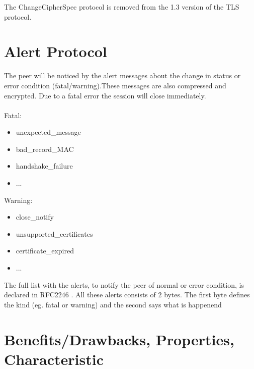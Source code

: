 The ChangeCipherSpec protocol is removed from the 1.3 version of the TLS protocol.

\section{Alert Protocol}
\label{sec:alert_protocol}
The peer will be noticed by the alert messages about the change in status or error condition (fatal/warning).These messages are also compressed and encrypted. Due to a fatal error the session will close immediately.\\\\ 
Fatal:
\begin{itemize}
	\item unexpected\_message
	 \item bad\_record\_MAC
	 \item handshake\_failure 
	 \item ...

	\end{itemize}
	
Warning:
\begin{itemize}
\item close\_notify
\item unsupported\_certificates
\item certificate\_expired
\item ...


\end{itemize}

The full list with the alerts, to notify the peer of normal or error condition, is declared in RFC2246 \cite{rfc2246}. All these alerts consists of 2 bytes. The first byte defines the kind (eg. fatal or warning) and the second says what is happenend \cite{W.Stalling} \cite{ms:overview}

\section{Benefits/Drawbacks, Properties, Characteristic}
\label{sec:introduction_suggestions}



